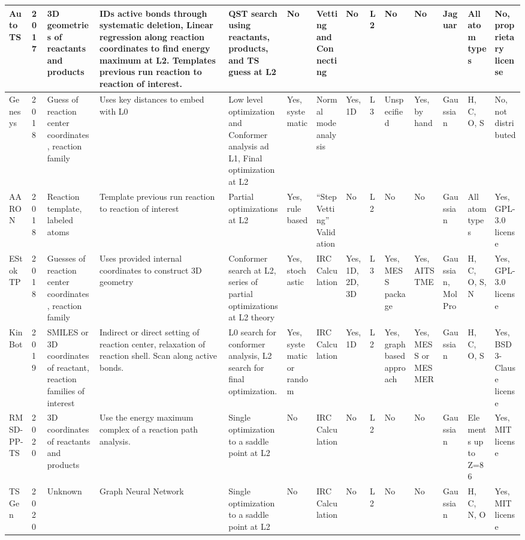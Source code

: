 \documentclass[preprint, 11pt]{elsarticle} %
\begin{document}
\begin{landscape}
\begin{singlespace}
\begin{scriptsize}
\begin{longtable}{| p{0.5in} | p{0.25in} | p{0.45in} | p{0.8in} | p{0.7in}| p{0.5in}| p{0.5in }| p{0.45in}| p{0.45in}| p{0.5in}| p{0.45in}| p{0.5in}| p{0.5in} | p{0.45in} |}
\hline
AutoTS   & 2017 &  3D geometries of reactants and products  &  IDs active bonds through systematic deletion, Linear regression along reaction coordinates to find energy maximum at L2. Templates previous run reaction to reaction of interest.  &  QST search using reactants, products, and TS guess at L2  &  No  &  Vetting and Connecting  &  No  & L2 &  No  &  No  &  Jaguar  &  All atom types  &  No, proprietary license  \\ 
\hline
Genesys  & 2018 &  Guess of reaction center coordinates, reaction family  &  Uses key distances to embed with L0  &  Low level optimization and Conformer analysis ad L1, Final optimization at L2  &  Yes, systematic  &  Normal mode analysis  &  Yes, 1D  & L3  &  Unspecified  &  Yes, by hand  &  Gaussian &  H, C, O, S  &  No, not distributed  \\ 
\hline
AARON    & 2018 &  Reaction template, labeled atoms  &  Template previous run reaction to reaction of interest  &  Partial optimizations at L2  &  Yes, rule based  &  ``Step Vetting'' Validation  &  No  & L2 &  No  &  No  &  Gaussian  &  All atom types  &  Yes, GPL-3.0 license  \\ 
\hline
EStokTP  & 2018 &  Guesses of reaction center coordinates, reaction family  &  Uses provided internal coordinates to construct 3D geometry  &  Conformer search at L2, series of partial optimizations at L2 theory  &  Yes, stochastic  &  IRC Calculation  & Yes, 1D, 2D, 3D  & L3  &  Yes, MESS package  &  Yes, AITSTME  &  Gaussian, MolPro  &  H, C, O, S, N  &  Yes, GPL-3.0 license   \\ 
\hline
KinBot   & 2019 &  SMILES or 3D coordinates of reactant, reaction families of interest  &  Indirect or direct setting of reaction center, relaxation of reaction shell. Scan along active bonds.   &  L0 search for conformer analysis, L2 search for final optimization.  &  Yes, systematic or random  &  IRC Calculation  &  Yes, 1D  & L2 &  Yes, graph based approach  &  Yes, MESS or MESMER  &  Gaussian  &  H, C, O, S  &  Yes, BSD 3-Clause license  \\ 
\hline
RMSD-PP-TS & 2020 & 3D coordinates of reactants and products & Use the energy maximum complex of a reaction path analysis. & Single optimization to a saddle point at L2 & No & IRC Calculation & No & L2 & No & No & Gaussian & Elements up to Z=86 & Yes, MIT license 
\\
\hline
TS Gen & 2020 & Unknown & Graph Neural Network & Single optimization to a saddle point at L2 & No & IRC Calculation & No & L2 & No & No & Gaussian & H, C, N, O & Yes, MIT license 

\end{longtable}
\end{scriptsize}
\end{singlespace}
\end{landscape}
\end{document}
